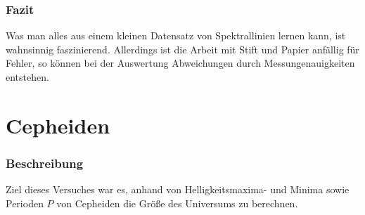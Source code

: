\documentclass[12pt]{article}
\begin{document}
\newpage\noindent\subsubsection*{Fazit}
Was man alles aus einem kleinen Datensatz von Spektrallinien lernen kann, ist wahnsinnig faszinierend. Allerdings ist die Arbeit mit Stift und Papier anfällig für Fehler, so können bei der Auswertung Abweichungen durch Messungenauigkeiten entstehen.\\
\section{Cepheiden}
\subsubsection*{Beschreibung}
Ziel dieses Versuches war es, anhand von Helligkeitsmaxima- und Minima sowie Perioden $P$ von Cepheiden die Größe des Universums zu berechnen.
\end{document}
